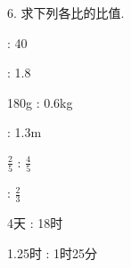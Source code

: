 6. 求下列各比的比值.

\begin{subquestions}

     : 40 

     : 1.8 

    \subquestion 180g : 0.6kg 

    \subquestion 169cm : 1.3m

    $\frac{2}{5}$ : $\frac{4}{5}$ 

     : $\frac{2}{3}$    

    \subquestion 4天 : 18时    

    \subquestion 1.25时 : 1时25分 

\end{subquestions}





